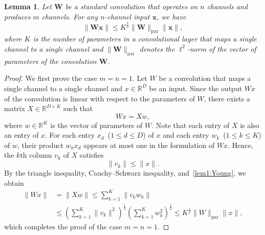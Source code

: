 \documentclass[10pt,a4paper]{amsart}
\numberwithin{equation}{section}
\newtheorem{lemma}[lemma]{Lemma}
\theoremstyle{remark}
\newcommand\bW{\mathbf{W}}
\newcommand\bx{\mathbf{x}}
\newcommand\param{\mathrm{par}}
\begin{document}
\begin{lemma}
\label{lem:Young}
Let $\bW$ be a standard convolution that operates on $n$ channels and produces $m$ channels.
For any $n$-channel input $\bx$, we have
\begin{equation*}
\| \bW \bx \| \leq K^{\frac{1}{2}} \| \bW \|_{\param} \| \bx \|,
\end{equation*}
where $K$ is the number of parameters in a convolutional layer that maps a single channel to a single channel and $\| \bW \|_{\param}$ denotes the $\ell^2$-norm of the vector of parameters of the convolution $\bW$.
\end{lemma}
\begin{proof}
    We first prove the case $m = n =1$.
    Let $W$ be a convolution that maps a single channel to a single channel and $x \in \mathbb{R}^D$ be an input.
    Since the output $Wx$ of the convolution is linear with respect to the parameters of $W$, there exists a matrix $X \in \mathbb{R}^{D \times K}$ such that
    \begin{equation*}
        W x = X w,
    \end{equation*}
    where $w \in \mathbb{R}^K$ is the vector of parameters of $W$.
    Note that each entry of $X$ is also an entry of $x$.
    For each entry $x_d$~($1 \leq d \leq D$) of $x$ and each entry $w_k$~($1 \leq k \leq K$) of $w$, their product $w_k x_d$ appears at most one in the formulation of $W x$.
    Hence, the $k$th column $v_k$ of $X$ satisfies
    \begin{equation}
        \label{lem1:Young}
        \| v_k \| \leq \| x \|.
    \end{equation}
    By the triangle inequality, Cauchy--Schwarz inequality, and~\eqref{lem1:Young}, we obtain
    \begin{equation}
        \label{lem2:Young}
        \begin{split}
        \| W x \| &= \| X w \| \leq \sum_{k=1}^K \| v_k w_k \| \\
        &\leq \left( \sum_{k=1}^K \| v_k \|^2 \right)^{\frac{1}{2}} \left( \sum_{k=1}^K w_k^2 \right)^{\frac{1}{2}}
        \leq K^{\frac{1}{2}} \| W \|_{\param} \| x \|,
        \end{split}
    \end{equation}
    which completes the proof of the case $m = n = 1$.


\end{proof}
\end{document}
